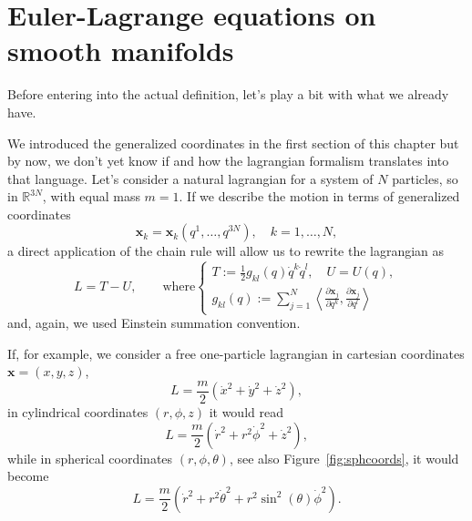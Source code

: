 \documentclass[english,fontsize=11pt,paper=a5,oneside]{scrbook}
\newcommand{\R}{\mathbb{R}}
\newcommand{\bx}{\bm{x}}
\newcommand{\lag}{\langle}
\newcommand{\rag}{\rangle}
\theoremstyle{definition}
\begin{document}
\section{Euler-Lagrange equations on smooth manifolds}\label{sec:lagrangianonmanifold}

Before entering into the actual definition, let's play a bit with what we already have.

We introduced the generalized coordinates in the first section of this chapter but by now, we don't yet know if and how the lagrangian formalism translates into that language.
Let's consider a natural lagrangian for a system of $N$ particles, so in $\R^{3N}$, with equal mass $m=1$.
If we describe the motion in terms of generalized coordinates
\begin{equation}
    \bx_k = \bx_k(q^1, \ldots, q^{3N}), \quad k=1,\ldots,N,
\end{equation}
a direct application of the chain rule will allow us to rewrite the lagrangian as
\begin{equation}
    L = T - U,
    \qquad\mbox{where}
    \begin{cases}
        T:= \frac12 g_{kl}(q)\dot q^k \dot q^l, \quad U = U(q),\\
        g_{kl} (q) := \sum_{j=1}^N \left\lag\frac{\partial\bx_j}{\partial q^k}, \frac{\partial \bx_j}{\partial q^l}\right\rag
    \end{cases}
\end{equation}
and, again, we used Einstein summation convention.

If, for example, we consider a free one-particle lagrangian in cartesian coordinates $\bx = (x,y,z)$,
\begin{equation}
    L = \frac m2 (\dot x^2 + \dot y^2 + \dot z^2),
\end{equation}
in cylindrical coordinates $(r,\phi,z)$ it would read
\begin{equation}
    L = \frac m2 (\dot r^2 + r^2 \dot \phi^2 + \dot z^2),
\end{equation}
while in spherical coordinates $(r,\phi,\theta)$, see also Figure~\ref{fig:sphcoords}, it would become
\begin{equation}
    L = \frac m2 (\dot r^2 + r^2 \dot \theta^2 + r^2 \sin^2(\theta) \dot \phi^2).
\end{equation}
\end{document}
